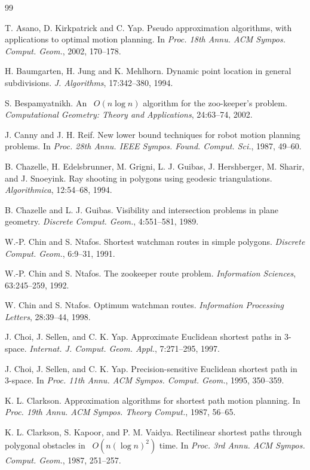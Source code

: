 \documentclass[11pt]{article}
\begin{document}
\begin{thebibliography}{99}

 T. Asano, D. Kirkpatrick and C. Yap. Pseudo approximation algorithms, with applications to optimal motion planning. In \emph{Proc. 18th Annu. ACM Sympos. Comput. Geom.}, 2002, 170--178.

 H. Baumgarten, H. Jung and K. Mehlhorn. Dynamic point location in general subdivisions. \emph{J. Algorithms}, 17:342--380, 1994.

 S. Bespamyatnikh. An ~\(O(n\log n)\) algorithm for the zoo-keeper's problem. \emph{Computational Geometry: Theory and Applications}, 24:63--74, 2002.

 J. Canny and J. H. Reif. New lower bound techniques for robot motion planning problems. In \emph{Proc. 28th Annu. IEEE Sympos. Found. Comput. Sci.}, 1987, 49--60.

 B. Chazelle, H. Edelsbrunner, M. Grigni, L. J. Guibas, J. Hershberger, M. Sharir, and J. Snoeyink. Ray shooting in polygons using geodesic triangulations. \emph{Algorithmica}, 12:54--68, 1994.

 B. Chazelle and L. J. Guibas. Visibility and intersection problems in plane geometry. \emph{Discrete Comput. Geom.}, 4:551--581, 1989.

 W.-P. Chin and S. Ntafos. Shortest watchman routes in simple polygons. \emph{Discrete Comput. Geom.}, 6:9--31, 1991.

 W.-P. Chin and S. Ntafos. The zookeeper route problem. \emph{Information Sciences}, 63:245--259, 1992.

 W. Chin and S. Ntafos. Optimum watchman routes. \emph{Information Processing Letters}, 28:39--44, 1998.

 J. Choi, J. Sellen, and C. K. Yap. Approximate Euclidean shortest paths in 3-space. \emph{Internat. J. Comput. Geom. Appl.}, 7:271--295, 1997.

 J. Choi, J. Sellen, and C. K. Yap. Precision-sensitive Euclidean shortest path in 3-space. In \emph{Proc. 11th Annu. ACM Sympos. Comput. Geom.}, 1995, 350--359.

 K. L. Clarkson. Approximation algorithms for shortest path motion planning. In \emph{Proc. 19th Annu. ACM Sympos. Theory Comput.}, 1987, 56--65.

 K. L. Clarkson, S. Kapoor, and P. M. Vaidya. Rectilinear shortest paths through polygonal obstacles in ~\(O(n(\log n)^2)\) time. In \emph{Proc. 3rd Annu. ACM Sympos. Comput. Geom.}, 1987, 251--257.


\end{thebibliography}
\end{document}

